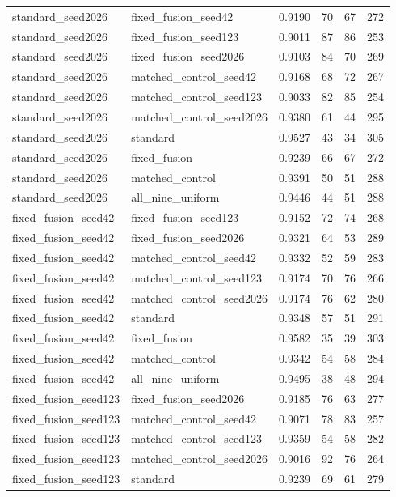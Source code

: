 \begin{tabular}{llrrrr}
standard\_seed2026 & fixed\_fusion\_seed42 & 0.9190 & 70 & 67 & 272 \\
standard\_seed2026 & fixed\_fusion\_seed123 & 0.9011 & 87 & 86 & 253 \\
standard\_seed2026 & fixed\_fusion\_seed2026 & 0.9103 & 84 & 70 & 269 \\
standard\_seed2026 & matched\_control\_seed42 & 0.9168 & 68 & 72 & 267 \\
standard\_seed2026 & matched\_control\_seed123 & 0.9033 & 82 & 85 & 254 \\
standard\_seed2026 & matched\_control\_seed2026 & 0.9380 & 61 & 44 & 295 \\
standard\_seed2026 & standard & 0.9527 & 43 & 34 & 305 \\
standard\_seed2026 & fixed\_fusion & 0.9239 & 66 & 67 & 272 \\
standard\_seed2026 & matched\_control & 0.9391 & 50 & 51 & 288 \\
standard\_seed2026 & all\_nine\_uniform & 0.9446 & 44 & 51 & 288 \\
fixed\_fusion\_seed42 & fixed\_fusion\_seed123 & 0.9152 & 72 & 74 & 268 \\
fixed\_fusion\_seed42 & fixed\_fusion\_seed2026 & 0.9321 & 64 & 53 & 289 \\
fixed\_fusion\_seed42 & matched\_control\_seed42 & 0.9332 & 52 & 59 & 283 \\
fixed\_fusion\_seed42 & matched\_control\_seed123 & 0.9174 & 70 & 76 & 266 \\
fixed\_fusion\_seed42 & matched\_control\_seed2026 & 0.9174 & 76 & 62 & 280 \\
fixed\_fusion\_seed42 & standard & 0.9348 & 57 & 51 & 291 \\
fixed\_fusion\_seed42 & fixed\_fusion & 0.9582 & 35 & 39 & 303 \\
fixed\_fusion\_seed42 & matched\_control & 0.9342 & 54 & 58 & 284 \\
fixed\_fusion\_seed42 & all\_nine\_uniform & 0.9495 & 38 & 48 & 294 \\
fixed\_fusion\_seed123 & fixed\_fusion\_seed2026 & 0.9185 & 76 & 63 & 277 \\
fixed\_fusion\_seed123 & matched\_control\_seed42 & 0.9071 & 78 & 83 & 257 \\
fixed\_fusion\_seed123 & matched\_control\_seed123 & 0.9359 & 54 & 58 & 282 \\
fixed\_fusion\_seed123 & matched\_control\_seed2026 & 0.9016 & 92 & 76 & 264 \\
fixed\_fusion\_seed123 & standard & 0.9239 & 69 & 61 & 279 \\

\end{tabular}
